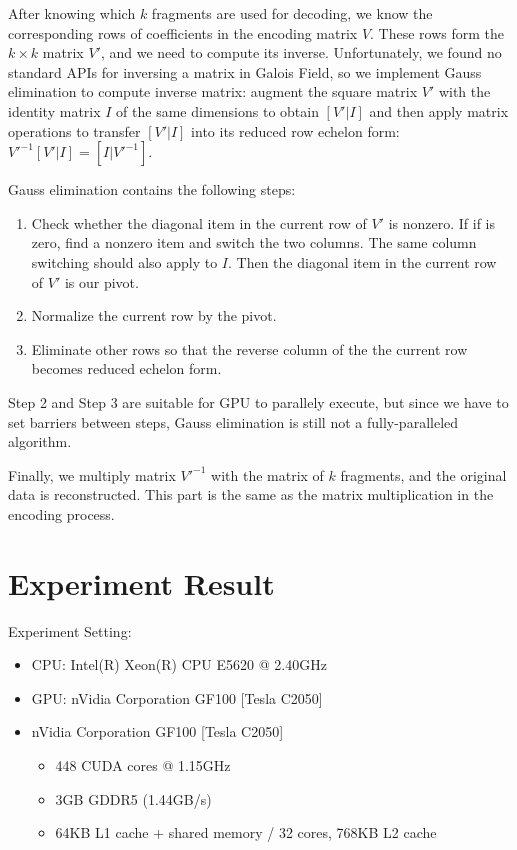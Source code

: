 \documentclass[a4paper]{article}
\begin{document}

After knowing which $k$ fragments are used for decoding, we know the corresponding rows of coefficients in the encoding matrix $V$.
These rows form the $k \times k$ matrix $V'$, and we need to compute its inverse.
Unfortunately, we found no standard APIs for inversing a matrix in Galois Field, 
so we implement Gauss elimination to compute inverse matrix: 
augment the square matrix $V'$ with the identity matrix $I$ of the same dimensions to obtain $[V' | I]$ and then apply matrix operations to transfer $[V' | I]$ into its reduced row echelon form: $V'^{-1}[V' | I] = [I | V'^{-1}]$.

Gauss elimination contains the following steps:
\begin{enumerate}
\item Check whether the diagonal item in the current row of $V'$ is nonzero. If if is zero, find a nonzero item and switch the two columns. The same column switching should also apply to $I$. Then the diagonal item in the current row of $V'$ is our pivot.
\item Normalize the current row by the pivot.
\item Eliminate other rows so that the reverse column of the the current row becomes reduced echelon form.
\end{enumerate}
Step 2 and Step 3 are suitable for GPU to parallely execute, but since we have to set barriers between steps, Gauss elimination is still not a fully-paralleled algorithm.

Finally, we multiply matrix $V'^{-1}$ with the matrix of $k$ fragments,
and the original data is reconstructed. This part is the same as the matrix multiplication in the encoding process.

\section{Experiment Result}
Experiment Setting:
\begin{itemize}
  \item CPU: Intel(R) Xeon(R) CPU E5620  @ 2.40GHz
  \item GPU: nVidia Corporation GF100 [Tesla C2050]
  \item nVidia Corporation GF100 [Tesla C2050]
	\begin{itemize}
	  \item 448 CUDA cores @ 1.15GHz
	  \item 3GB GDDR5 (1.44GB/s)
	  \item 64KB L1 cache + shared memory / 32 cores, 768KB L2 cache
	\end{itemize}
\end{itemize}
\end{document}
